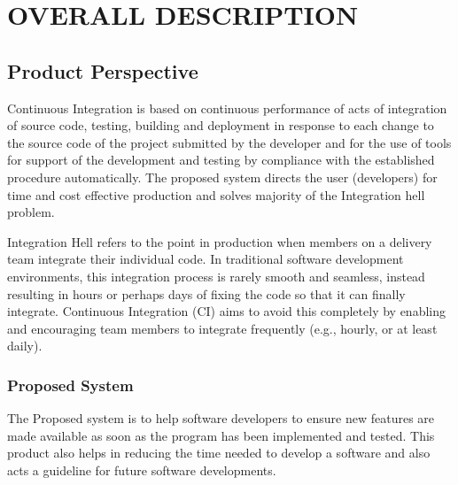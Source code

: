 \documentclass[12pt,a4paper,oneside]{report}
\begin{document}
\chapter{OVERALL DESCRIPTION}
\section{Product Perspective}
\par
Continuous Integration is based on continuous performance of acts of integration of
source code, testing, building and deployment in response to each change to the source code of
the project submitted by the developer and for the use of tools for support of the development
and testing by compliance with the established procedure automatically. The proposed system
directs the user (developers) for time and cost effective production and solves majority of the
Integration hell problem. \par
Integration Hell refers to the point in production when members on a delivery team integrate
their individual code. In traditional software development environments, this integration
process is rarely smooth and seamless, instead resulting in hours or perhaps days of fixing the
code so that it can finally integrate. Continuous Integration (CI) aims to avoid this completely
by enabling and encouraging team members to integrate frequently (e.g., hourly, or at least
daily).

\subsection{Proposed System}
\par 
The Proposed system is to help software developers to ensure new features are made
available as soon as the program has been implemented and tested. This product also helps in
reducing the time needed to develop a software and also acts a guideline for future software
developments.
\end{document}
